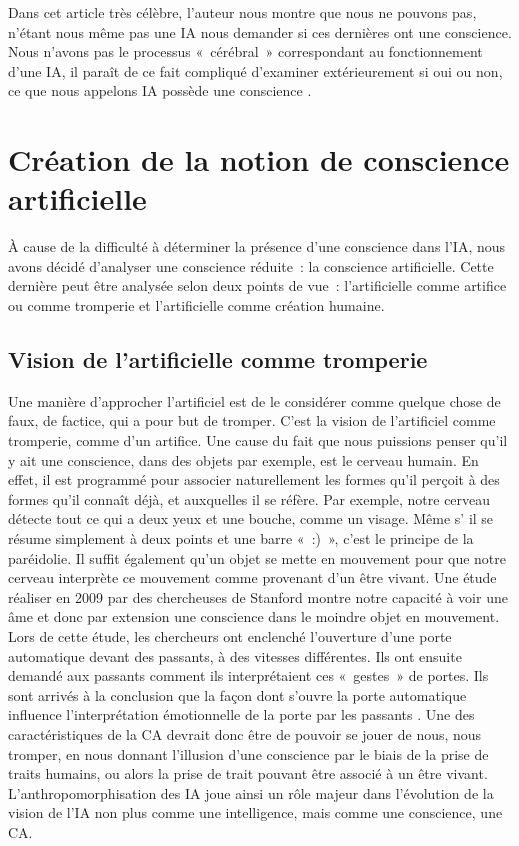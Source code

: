 \documentclass[a4paper, titlepage, 12pt]{article}
\begin{document}
	Dans cet article très célèbre, l’auteur nous montre que nous ne pouvons pas, n’étant nous même pas une IA nous demander si ces dernières ont une conscience. Nous n’avons pas le processus «~cérébral~» correspondant au fonctionnement d’une IA, il paraît de ce fait compliqué d’examiner extérieurement si oui ou non, ce que nous appelons IA possède une conscience \cite{nagelWhatItBe2012}.
	\newpage
	\section{Création de la notion de conscience artificielle}
	À cause de la difficulté à déterminer la présence d'une conscience dans l'IA, nous avons décidé d'analyser une conscience réduite~: la conscience artificielle. Cette dernière peut être analysée selon deux points de vue~: l'artificielle comme artifice ou comme tromperie et l'artificielle comme création humaine.
	\subsection{Vision de l'artificielle comme tromperie}
	Une manière d’approcher l’artificiel est de le considérer comme quelque chose de faux, de factice, qui a pour but de tromper. C’est la vision de l’artificiel comme tromperie, comme d’un artifice. Une cause du fait que nous puissions penser qu’il y ait une conscience, dans des objets par exemple, est le cerveau humain. En effet, il est programmé pour associer naturellement les formes qu’il perçoit à des formes qu’il connaît déjà, et auxquelles il se réfère. Par exemple, notre cerveau détecte tout ce qui a deux yeux et une bouche, comme un visage. Même s' il se résume simplement à deux points et une barre «~:)~», c’est le principe de la paréidolie. Il suffit également qu’un objet se mette en mouvement pour que notre cerveau interprète ce mouvement comme provenant d’un être vivant. Une étude réaliser en 2009 par des chercheuses de Stanford montre notre capacité à voir une âme et donc par extension une conscience dans le moindre objet en mouvement. Lors de cette étude, les chercheurs ont enclenché l’ouverture d’une porte automatique devant des passants, à des vitesses différentes. Ils ont ensuite demandé aux passants comment ils interprétaient ces «~gestes~» de portes. Ils sont arrivés à la conclusion que la façon dont s’ouvre la porte automatique influence l’interprétation émotionnelle de la porte par les passants \cite{juApproachabilityHowPeople2009}. Une des caractéristiques de la CA devrait donc être de pouvoir se jouer de nous, nous tromper, en nous donnant l’illusion d’une conscience par le biais de la prise de traits humains, ou alors la prise de trait pouvant être associé à un être vivant. L’anthropomorphisation des IA joue ainsi un rôle majeur dans l’évolution de la vision de l’IA non plus comme une intelligence, mais comme une conscience, une CA.
\end{document}
